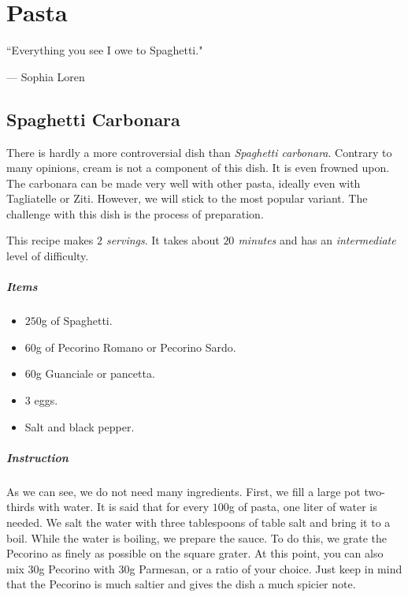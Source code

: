 \chapter{Pasta}
\label{pasta}
\epigraph{``Everything you see I owe to Spaghetti."}{--- \textup{Sophia Loren}}

\section{Spaghetti Carbonara}
\label{Spaghetticarbonara}
There is hardly a more controversial dish than \emph{Spaghetti carbonara}. Contrary to many opinions, cream is not a component of this dish. It is even frowned upon. The carbonara can be made very well with other pasta, ideally even with Tagliatelle or Ziti. However, we will stick to the most popular variant. The challenge with this dish is the process of preparation.

This recipe makes \emph{$2$ servings}. It takes about \emph{$20$ minutes} and has an \emph{intermediate} level of difficulty. 

\paragraph{Items}
\begin{itemize}[noitemsep]
    \item[\ding{182}] $250$g of Spaghetti.
    \item[\ding{183}] $60$g of Pecorino Romano or Pecorino Sardo.
    \item[\ding{184}] $60$g Guanciale or pancetta.
    \item[\ding{185}] $3$ eggs.
    \item[\ding{186}] Salt and black pepper.
\end{itemize}

\paragraph{Instruction} 
As we can see, we do not need many ingredients. First, we fill a large pot two-thirds with water. It is said that for every $100$g of pasta, one liter of water is needed. We salt the water with three tablespoons of table salt and bring it to a boil. While the water is boiling, we prepare the sauce. To do this, we grate the Pecorino as finely as possible on the square grater. At this point, you can also mix $30$g Pecorino with $30$g Parmesan, or a ratio of your choice. Just keep in mind that the Pecorino is much saltier and gives the dish a much spicier note.

